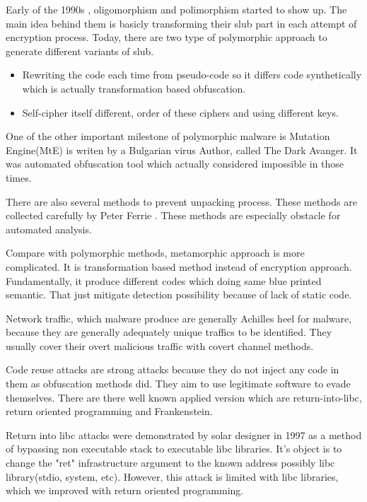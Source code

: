 \documentclass[informationsecurity]{gucmasterproject}
\begin{document}
Early of the 1990s , oligomorphism and polimorphism started to show up\cite{you2010malware}. The main idea behind them is basicly transforming their slub part in each attempt of encryption process\cite{nachenberg1996understanding}. Today, there are two type of  polymorphic approach to generate different variants of slub.\cite{li2011mechanisms}
\begin{itemize}
  \item Rewriting the code each time from pseudo-code so it differs code synthetically which is actually transformation based obfuscation.
  \item Self-cipher itself different, order of these ciphers and using different keys.
\end{itemize}
One of the other important milestone of polymorphic malware is Mutation Engine(MtE) is writen by a Bulgarian virus Author, called The Dark Avanger. It was automated obfuscation tool which actually considered impossible in those times.\cite{anonymous1}

There are also several methods to prevent unpacking process. These methods are collected carefully by Peter Ferrie \cite{ferrie2008anti}. These methods are especially obstacle for automated analysis.

Compare with polymorphic methods, metamorphic approach is more complicated. It is transformation based method instead of encryption  approach.\cite{konstantinou2008metamorphic} Fundamentally, it produce different codes which doing same blue printed semantic. That just mitigate detection possibility because of lack of static code. 

Network traffic, which malware produce are generally Achilles heel for malware, because they are generally adequately unique traffics to be identified\cite{marpaung2012survey}. They usually cover their overt malicious traffic with covert channel methods.\cite{rutkowska2006rootkits}

Code reuse attacks are strong attacks because they do not inject any code in them as obfuscation methods did. They aim to use legitimate software to evade themselves. There are there well known applied version which are return-into-libc, return oriented programming and Frankenstein.

Return into libc attacks were demonstrated by solar designer in 1997 as a method of bypassing non executable stack to executable libc libraries\cite{designer1997getting}. It's object is to change the "ret" infrastructure argument to the known address possibly libc library(stdio, system, etc). However, this attack is limited with libc libraries, which we improved with return oriented programming. 
\end{document}
